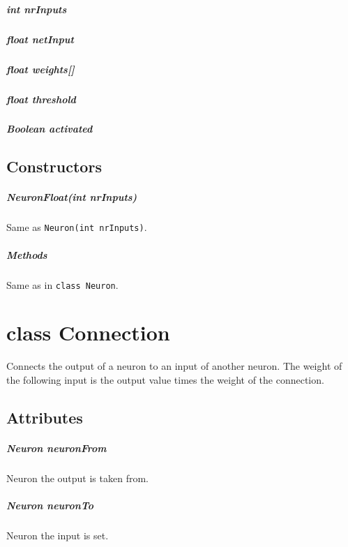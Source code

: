\paragraph{int nrInputs}
\paragraph{float netInput}
\paragraph{float weights[]}
\paragraph{float threshold}
\paragraph{Boolean activated}

\section{Constructors}
\paragraph{NeuronFloat(int nrInputs)}
Same as \texttt{Neuron(int nrInputs)}.

\paragraph{Methods}
Same as in \texttt{class Neuron}.

\chapter{class Connection}
Connects the output of a neuron to an input of another neuron. The weight of the following input is the output value times the weight of the connection.

\section{Attributes}
\paragraph{Neuron neuronFrom}
Neuron the output is taken from.

\paragraph{Neuron neuronTo}
Neuron the input is set.

